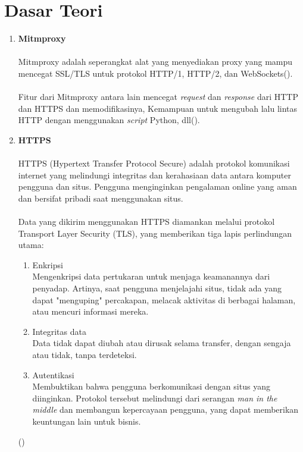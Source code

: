 \documentclass[./bab_2.tex]{subfiles}
\begin{document}
\section{Dasar Teori}
\begin{enumerate}[label=\textbf{\arabic*.}]
  \item \textbf{Mitmproxy}
  \paragraph*{}Mitmproxy adalah seperangkat alat yang
  menyediakan proxy yang mampu mencegat SSL/TLS untuk
  protokol HTTP/1, HTTP/2, dan WebSockets(\cite{mitmproxy}).

  \paragraph*{}Fitur dari Mitmproxy antara lain mencegat
  \textit{request} dan \textit{response} dari  HTTP dan
  HTTPS dan memodifikasinya, Kemampuan untuk mengubah lalu
  lintas HTTP dengan menggunakan \textit{script} Python,
  dll(\cite{mitmproxy}).

  \item \textbf{HTTPS}
  \paragraph*{}HTTPS (Hypertext Transfer Protocol Secure)
  adalah protokol komunikasi internet yang melindungi
  integritas dan kerahasiaan data antara komputer pengguna
  dan situs. Pengguna menginginkan pengalaman online yang
  aman dan bersifat pribadi saat menggunakan situs.

  \paragraph*{}Data yang dikirim menggunakan HTTPS diamankan
  melalui protokol Transport Layer Security (TLS), yang
  memberikan tiga lapis perlindungan utama:
  \begin{enumerate}
    \item Enkripsi\\
      Mengenkripsi data pertukaran untuk menjaga keamanannya
      dari penyadap. Artinya, saat pengguna menjelajahi
      situs, tidak ada yang dapat "menguping" percakapan,
      melacak aktivitas di berbagai halaman, atau mencuri
      informasi mereka.
    \item Integritas data\\
      Data tidak dapat diubah atau dirusak selama transfer,
      dengan sengaja atau tidak, tanpa terdeteksi.
    \item Autentikasi\\
      Membuktikan bahwa pengguna berkomunikasi dengan
      situs yang diinginkan. Protokol tersebut melindungi
      dari serangan \textit{man in the middle} dan membangun
      kepercayaan pengguna, yang dapat memberikan keuntungan
      lain untuk bisnis.
  \end{enumerate}
  (\cite{googledev-https})


\end{enumerate}
\end{document}
